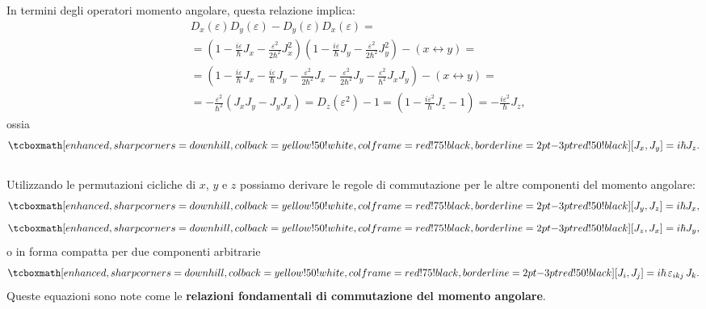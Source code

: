 In termini degli operatori momento angolare, questa relazione implica:
	\begin{align}
		& D_x (\varepsilon)D_y (\varepsilon)-D_y (\varepsilon)D_x (\varepsilon)= \nonumber\\
		&  = \left(1-\frac{i\varepsilon}{\hbar} J_x -\frac{\varepsilon ^2}{2\hbar ^2}J_x ^2\right)\left(1-\frac{i\varepsilon}{\hbar} J_y -\frac{\varepsilon ^2}{2\hbar ^2}J_y ^2\right)- \left( x \leftrightarrow y\right) =\nonumber \\
		& = \left(1-\frac{i\varepsilon}{\hbar} J_x-\frac{i\varepsilon}{\hbar} J_y-\frac{\varepsilon ^2}{2\hbar ^2}J_x-\frac{\varepsilon ^2}{2\hbar ^2}J_y-\frac{\varepsilon ^2}{\hbar ^2}J_xJ_y \right) - \left( x \leftrightarrow y\right) = \nonumber \\
		&  = -\frac{\varepsilon ^2}{\hbar ^2}\left(J_xJ_y-J_y J_x\right) = D_z (\varepsilon ^2)- 1= \left(1-\frac{i\varepsilon ^2}{\hbar} J_z-1\right)=-\frac{i\varepsilon ^2}{\hbar} J_z, 
	\end{align}
ossia
	\begin{equation}
		\tcboxmath[enhanced, sharp corners=downhill, colback=yellow!50!white, colframe=red!75!black, borderline={2pt}{-3pt}{red!50!black}]{
			[ J_x, J_y ] = i\hbar J_z.
			 }
	\end{equation}\\
	
Utilizzando le permutazioni cicliche di $x$, $y$ e $z$ possiamo derivare le regole di commutazione per le altre componenti del momento angolare:
	\begin{equation}
		\tcboxmath[enhanced, sharp corners=downhill, colback=yellow!50!white, colframe=red!75!black, borderline={2pt}{-3pt}{red!50!black}]{
			[ J_y, J_z ] = i\hbar J_x,
			}
	\end{equation}
	\begin{equation}
		\tcboxmath[enhanced, sharp corners=downhill, colback=yellow!50!white, colframe=red!75!black, borderline={2pt}{-3pt}{red!50!black}]{
			[ J_z, J_x ] = i\hbar J_y,
			}
	\end{equation}
o in forma compatta per due componenti arbitrarie
	\begin{equation}
		\tcboxmath[enhanced, sharp corners=downhill, colback=yellow!50!white, colframe=red!75!black, borderline={2pt}{-3pt}{red!50!black}]{
			[ J_i, J_j ] = i\hbar\, \varepsilon _{ikj}\,J_k.
			}
	\label{eq:cap16_1}
	\end{equation}
Queste equazioni sono note come le \textbf{relazioni fondamentali di commutazione del momento angolare}.\\

